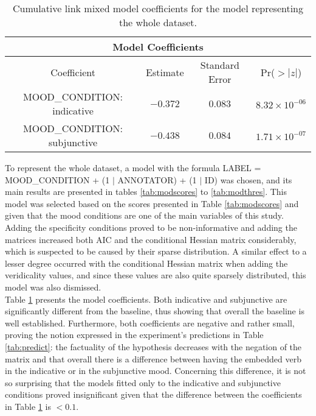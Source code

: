 \begin{table}
\center
  \begin{tabular}{|c|c|c|c|}
  \hline
  \multicolumn{4}{|c|}{Model Coefficients}\\\hline
  Coefficient & Estimate &Standard Error & Pr($>|z|$)\\\hline
MOOD\_CONDITION: indicative  & $-0.372$ &$0.083$ &$8.32\times 10^{-06}$\\\hline
MOOD\_CONDITION: subjunctive & $-0.438$ &$0.084$ &$1.71\times 10^{-07}$\\\hline 
  \end{tabular}
  \caption[Model Coefficients.]{Cumulative link mixed model coefficients for the model representing the whole dataset.}
  \label{tab:modcoeff} 
\end{table}

To represent the whole dataset, a model with the formula LABEL =  MOOD\_CONDITION + (1 $\mid$ ANNOTATOR) +  (1 $\mid$ ID) was chosen, and its main results are presented in tables \ref{tab:modscores} to \ref{tab:modthres}. This model was selected based on the scores presented in Table \ref{tab:modscores} and given that the mood conditions are one of the main variables of this study. Adding the specificity conditions proved to be non-informative and adding the matrices increased both AIC and the conditional Hessian matrix considerably, which is suspected to be caused by their sparse distribution. A similar effect to a lesser degree occurred with the conditional Hessian matrix when adding the veridicality values, and since these values are also quite sparsely distributed, this model was also dismissed.\\  

Table \ref{tab:modcoeff} presents the model coefficients. Both indicative and subjunctive are significantly different from the baseline, thus showing that overall the baseline is well established. Furthermore, both coefficients are negative and rather small, proving the notion expressed in the experiment's predictions in Table \ref{tab:predict}: the factuality of the hypothesis decreases with the negation of the matrix and that overall there is a difference between having the embedded verb in the indicative or in the subjunctive mood. Concerning this difference, it is not so surprising that the models fitted only to the indicative and subjunctive conditions proved insignificant given that the difference between the coefficients in Table \ref{tab:modcoeff} is $<0.1$.\\

